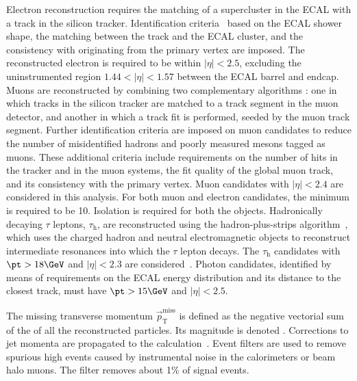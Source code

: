 Electron reconstruction requires the matching of a supercluster in the ECAL with a track in the silicon tracker.
Identification criteria~\cite{Khachatryan:2015hwa} based on the ECAL shower shape, the matching between the track and the ECAL cluster, and the consistency with originating from the primary vertex are imposed. The reconstructed electron is required to be within $|\eta|< 2.5$, excluding the uninstrumented region $1.44<|\eta|<1.57$ between the ECAL barrel and endcap. Muons are reconstructed by combining two complementary algorithms \cite{CMSMuonJINST}:
 one in which tracks in the silicon tracker are matched to a track segment in the muon detector, and another in which a track fit is performed, seeded by the muon track segment.  
Further identification criteria are imposed on muon candidates to reduce the number of misidentified hadrons and poorly measured mesons tagged as muons. 
These additional criteria include requirements on the number of hits in the tracker and in the muon systems, the fit quality of the global muon track, and its consistency with the primary vertex.
Muon candidates with $|\eta|< 2.4$ are considered in this analysis. 
For both muon and electron candidates, the minimum \pt is required to be 10\GeV. Isolation is required for both the objects.
Hadronically decaying $\tau$ leptons, $\tau_\mathrm{h}$, are reconstructed using the hadron-plus-strips
  algorithm~\cite{CMSTauJINST}, which uses the charged hadron and neutral electromagnetic objects 
to reconstruct intermediate resonances into which the $\tau$ lepton decays. The $\tau_\mathrm{h}$
candidates with $\pt>18\GeV$ and $|\eta|< 2.3$ are considered~\cite{Khachatryan:2015hwa,Chatrchyan:2013sba,CMSTauJINST}. Photon candidates, identified by means of requirements on the ECAL energy distribution and its distance to the closest track, must have $\pt>15\GeV$ and $|\eta|< 2.5$. %

The missing transverse momentum $\vec{p}_{\mathrm{T}}^{\mathrm{miss}}$ is defined as the negative vectorial sum of the \pt of all the reconstructed particles. Its magnitude is denoted \MET. Corrections to jet momenta are propagated to the \MET calculation~\cite{CMS-PAS-JME-16-004}. Event filters \cite{CMS-PAS-JME-16-004} are used to remove spurious high \MET events caused by instrumental noise in the calorimeters or beam halo muons. The filter removes about 1\% of signal events.

